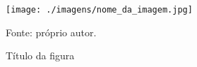 \begin{figure}[htbp]
    \centering
    \label{fig:nome_da_figura}
    \caption{Título da figura}
    \texttt{[image: ./imagens/nome\_da\_imagem.jpg]}
    \par \footnotesize Fonte: próprio autor. %
\end{figure}